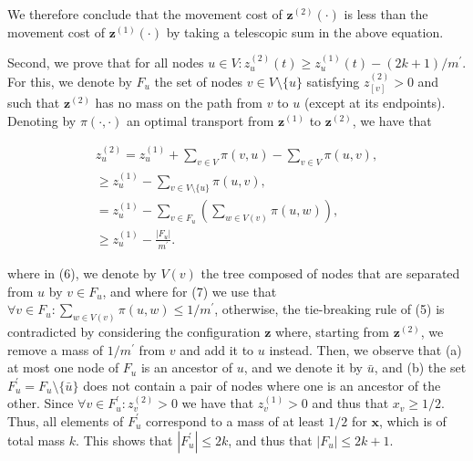\par




We therefore conclude that the movement cost of ${\mathbf{z}}^{(2)}(\cdot)$ is less than the movement cost of ${\mathbf{z}}^{(1)}(\cdot)$ by taking a telescopic sum in the above equation.\par




Second, we prove that for all nodes $u\in V\colon z^{(2)}_{u}(t)\geq z^{(1)}_{u}(t)-(2k+1)/m^{\prime}$. For this, we denote by $F_{u}$ the set of nodes $v\in V\setminus\{u\}$ satisfying $z^{(2)}_{[v]}>0$ and such that ${\mathbf{z}}^{(2)}$ has no mass on the path from $v$ to $u$ (except at its endpoints). Denoting by $\pi(\cdot,\cdot)$ an optimal transport from ${\mathbf{z}}^{(1)}$ to ${\mathbf{z}}^{(2)}$, we have that\par


\[\begin{gathered}
\displaystyle z^{(2)}_{u} \displaystyle=z^{(1)}_{u}+\sum_{v\in V}\pi(v,u)-\sum_{v\in V}\pi(u,v), \\
\displaystyle\geq z^{(1)}_{u}-\sum_{v\in V\setminus\{u\}}\pi(u,v), \\
\displaystyle=z^{(1)}_{u}-\sum_{v\in F_{u}}\left(\sum_{w\in V(v)}\pi(u,w)\right), \\
\displaystyle\geq z^{(1)}_{u}-\frac{|F_{u}|}{m^{\prime}}.
\end{gathered}\]


where in (6), we denote by $V(v)$ the tree composed of nodes that are separated from $u$ by $v\in F_{u}$, and where for (7) we use that $\forall v\in F_{u}\colon\sum_{w\in V(v)}\pi(u,w)\leq 1/m^{\prime}$, otherwise, the tie-breaking rule of (5) is contradicted by considering the configuration ${\mathbf{z}}$ where, starting from ${\mathbf{z}}^{(2)}$, we remove a mass of $1/m^{\prime}$ from $v$ and add it to $u$ instead. Then, we observe that (a) at most one node of $F_{u}$ is an ancestor of $u$, and we denote it by $\bar{u}$, and (b) the set $F_{u}^{\prime}=F_{u}\setminus\{\bar{u}\}$ does not contain a pair of nodes where one is an ancestor of the other. Since $\forall v\in F_{u}^{\prime}\colon z^{(2)}_{v}>0$ we have that $z^{(1)}_{v}>0$ and thus that $x_{v}\geq 1/2$. Thus, all elements of $F_{u}^{\prime}$ correspond to a mass of at least $1/2$ for ${\boldsymbol{x}}$, which is of total mass $k$. This shows that $|F_{u}^{\prime}|\leq 2k$, and thus that $|F_{u}|\leq 2k+1$.\par





